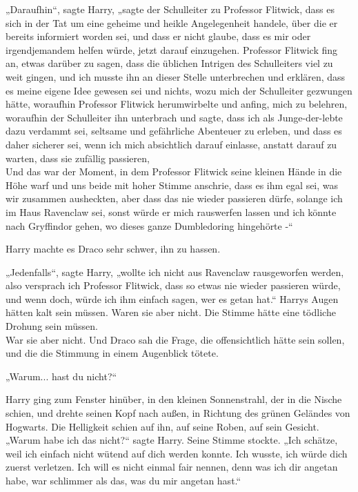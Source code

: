{„Daraufhin“, sagte Harry, „sagte der Schulleiter zu Professor Flitwick, dass es sich in der Tat um eine geheime und heikle Angelegenheit handele, über die er bereits informiert worden sei, und dass er nicht glaube, dass es mir oder irgendjemandem helfen würde, jetzt darauf einzugehen. Professor Flitwick fing an, etwas darüber zu sagen, dass die üblichen Intrigen des Schulleiters viel zu weit gingen, und ich musste ihn an dieser Stelle unterbrechen und erklären, dass es meine eigene Idee gewesen sei und nichts, wozu mich der Schulleiter gezwungen hätte, woraufhin Professor Flitwick herumwirbelte und anfing, mich zu belehren, woraufhin der Schulleiter ihn unterbrach und sagte, dass ich als Junge-der-lebte dazu verdammt sei, seltsame und gefährliche Abenteuer zu erleben, und dass es daher sicherer sei, wenn ich mich absichtlich darauf einlasse, anstatt darauf zu warten, dass sie zufällig passieren,\\ Und das war der Moment, in dem Professor Flitwick seine kleinen Hände in die Höhe warf und uns beide mit hoher Stimme anschrie, dass es ihm egal sei, was wir zusammen ausheckten, aber dass das nie wieder passieren dürfe, solange ich im Haus Ravenclaw sei, sonst würde er mich rauswerfen lassen und ich könnte nach Gryffindor gehen, wo dieses ganze Dumbledoring hingehörte -“

Harry machte es Draco sehr schwer, ihn zu hassen.

„Jedenfalls“, sagte Harry, „wollte ich nicht aus Ravenclaw rausgeworfen werden, also versprach ich Professor Flitwick, dass so etwas nie wieder passieren würde, und wenn doch, würde ich ihm einfach sagen, wer es getan hat.“ Harrys Augen hätten kalt sein müssen. Waren sie aber nicht. Die Stimme hätte eine tödliche Drohung sein müssen.\\ War sie aber nicht. Und Draco sah die Frage, die offensichtlich hätte sein sollen, und die die Stimmung in einem Augenblick tötete.

„Warum... hast du nicht?“

Harry ging zum Fenster hinüber, in den kleinen Sonnenstrahl, der in die Nische schien, und drehte seinen Kopf nach außen, in Richtung des grünen Geländes von Hogwarts. Die Helligkeit schien auf ihn, auf seine Roben, auf sein Gesicht.\\ „Warum habe ich das nicht?“ sagte Harry. Seine Stimme stockte. „Ich schätze, weil ich einfach nicht wütend auf dich werden konnte. Ich wusste, ich würde dich zuerst verletzen. Ich will es nicht einmal fair nennen, denn was ich dir angetan habe, war schlimmer als das, was du mir angetan hast.“

}
